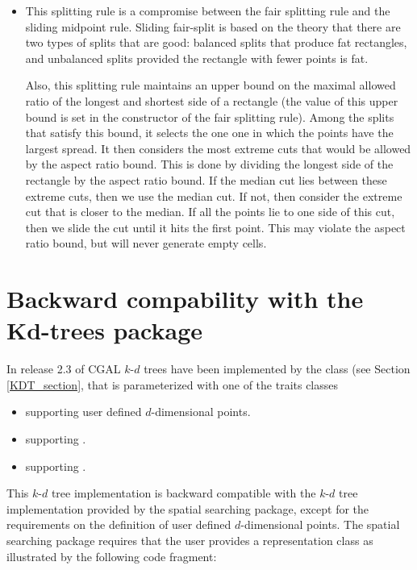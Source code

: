 \begin{itemize}
\item {}

This splitting rule is a compromise between the fair splitting rule
and the sliding midpoint rule.
Sliding fair-split is based on the theory that there are
two types of splits that are good: balanced splits that
produce fat rectangles, and unbalanced splits provided
the rectangle with fewer points is fat.

Also, this splitting rule maintains an upper
bound on the maximal allowed ratio of the longest and shortest side of
a rectangle (the value of this upper bound is set in the constructor of the
fair splitting rule). Among the splits that satisfy this bound, it selects
the one one in which the points have the largest spread.
It then considers the most extreme cuts that would be allowed by the
aspect ratio bound. This is done by dividing the longest side of
the rectangle by the aspect ratio bound. If the median cut lies
between these extreme cuts, then we use the median cut. If not,
then consider the extreme cut that is closer to the median.
If all the points lie to one side of this cut, then we slide the cut
until it hits the first point.
This may violate the aspect ratio bound, but will never generate empty cells.

\end{itemize}

\section{Backward compability with the Kd-trees package}
\label{Spatial_searching:Backward_compability_Kd-trees}

In release 2.3 of CGAL
$k$-$d$ trees have been implemented by the class  (see Section \ref{KDT_section}, that is parameterized with one of the
traits classes 

\begin{itemize}

\item
{} supporting user defined $d$-dimensional points.

\item 
{} supporting . 

\item
{} supporting . 

\end{itemize}

This $k$-$d$ tree implementation is backward compatible with the 
$k$-$d$ tree implementation provided by the spatial searching package,
except for the requirements on the definition of user defined $d$-dimensional points.
The spatial searching package requires that the user provides a representation
class  as illustrated by the following code fragment:


